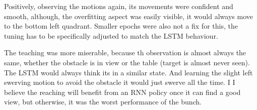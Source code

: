 Positively, observing the motions again, its movements were confident and smooth, although, the overfitting aspect was easily visible, it would always move to the bottom left quadrant. Smaller epochs were also not a fix for this, the tuning has to be specifically adjusted to match the LSTM behaviour.

The teaching was more miserable, because th observation is almost always the same, whether the obstacle is in view or the table (target is almost never seen). The LSTM would always think its in a similar state. And learning the slight left swerving motion to avoid the obstacle it would just swerve all the time. I I believe the reaching will benefit from an RNN policy once it can find a good view, but otherwise, it was the worst performance of the bunch.
